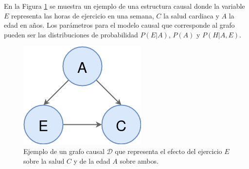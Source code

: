 En la Figura \ref{fig:dag-causal} se muestra un ejemplo de una
estructura causal donde la variable $E$ representa las horas de
ejercicio en una semana, $C$ la salud cardiaca y $A$ la edad en
años. Los parámetros para el modelo causal que corresponde al 
grafo pueden ser las distribuciones de probabilidad $P(E|A)$,
$P(A)$ y $P(H|A, E)$.

\begin{figure}
    \centering
    \includegraphics[scale=0.35]{Chapter2/Figs/example-dag.png}
    \caption{Ejemplo de un grafo causal $\mathcal{D}$ que representa el efecto del ejercicio $E$ sobre la salud $C$ y de la edad $A$ sobre ambos.}
    \label{fig:dag-causal}
\end{figure}
    




